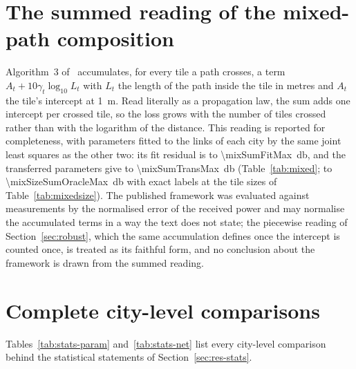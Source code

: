 \section{The summed reading of the mixed-path composition}
\label{app:summed}

Algorithm~3 of~\cite{ozyurt2026} accumulates, for every tile a path
crosses, a term $A_t+10\gamma_t\log_{10}L_t$ with $L_t$ the length of the
path inside the tile in metres and $A_t$ the tile's intercept at
\SI{1}{\metre}. Read literally as a propagation law, the sum adds one
intercept per crossed tile, so the loss grows with the number of tiles
crossed rather than with the logarithm of the distance. This reading is
reported for completeness, with parameters fitted to the links of each city
by the same joint least squares as the other two: its fit residual is
\mixSumFitMin{} to \SI{\mixSumFitMax}{\decibel}, and the transferred
parameters give \mixSumTransMin{} to \SI{\mixSumTransMax}{\decibel}
(Table~\ref{tab:mixed}; \mixSizeSumOracleMin{} to
\SI{\mixSizeSumOracleMax}{\decibel} with exact labels at the tile sizes of
Table~\ref{tab:mixedsize}). The published framework was evaluated against
measurements by the normalised error of the received power and may
normalise the accumulated terms in a way the text does not state; the
piecewise reading of Section~\ref{sec:robust}, which the same accumulation
defines once the intercept is counted once, is treated as its faithful form,
and no conclusion about the framework is drawn from the summed reading.

\section{Complete city-level comparisons}
\label{app:stats}

Tables~\ref{tab:stats-param} and~\ref{tab:stats-net} list every city-level
comparison behind the statistical statements of Section~\ref{sec:res-stats}.

\begin{table}[H]
\centering
\caption{City-level comparisons of the tile parameters ($n=\nFolds$ held-out
cities). $\Delta$: mean difference first minus second; CI: 95\% percentile
bootstrap over cities; $p$: exact two-sided Wilcoxon signed-rank; better:
cities in which the first is better; Holm: significant at 5\% after Holm's
correction within the family.}
\label{tab:stats-param}
\small

\end{table}

\begin{table}[H]
\centering
\caption{City-level comparisons at the network level, as in
Table~\ref{tab:stats-param} ($\Delta$ in percentage points for shares:
serving site, coverage agreement, regret).}
\label{tab:stats-net}
\small

\end{table}

